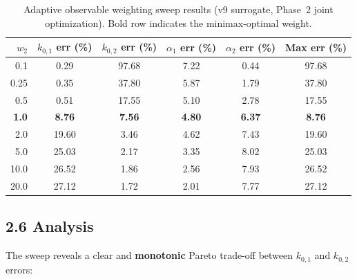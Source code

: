 \documentclass[11pt]{article}
\begin{document}
\begin{table}[H]
  \centering
  \caption{Adaptive observable weighting sweep results (v9 surrogate,
           Phase~2 joint optimization).  Bold row indicates the minimax-optimal
           weight.}
  \label{tab:weight_sweep}
  \begin{tabular}{r S[round-precision=2] S[round-precision=2]
                    S[round-precision=2] S[round-precision=2]
                    S[round-precision=2]}
    \toprule
    $w_2$ & {$k_{0,1}$ err (\%)} & {$k_{0,2}$ err (\%)}
          & {$\alpha_1$ err (\%)} & {$\alpha_2$ err (\%)}
          & {Max err (\%)} \\
       &  0.29 & 97.68 &  7.22 &  0.44 & 97.68 \\
    0.25  &  0.35 & 37.80 &  5.87 &  1.79 & 37.80 \\
    0.5   &  0.51 & 17.55 &  5.10 &  2.78 & 17.55 \\
    \textbf{1.0}   &  \textbf{8.76} &  \textbf{7.56} &  \textbf{4.80} &  \textbf{6.37} &  \textbf{8.76} \\
    2.0   & 19.60 &  3.46 &  4.62 &  7.43 & 19.60 \\
    5.0   & 25.03 &  2.17 &  3.35 &  8.02 & 25.03 \\
    10.0  & 26.52 &  1.86 &  2.56 &  7.93 & 26.52 \\
    20.0  & 27.12 &  1.72 &  2.01 &  7.77 & 27.12 \\
    \bottomrule
  \end{tabular}
\end{table}

\subsection*{2.6 Analysis}

The sweep reveals a clear and \textbf{monotonic} Pareto trade-off between
$k_{0,1}$ and $k_{0,2}$ errors:
\end{document}

